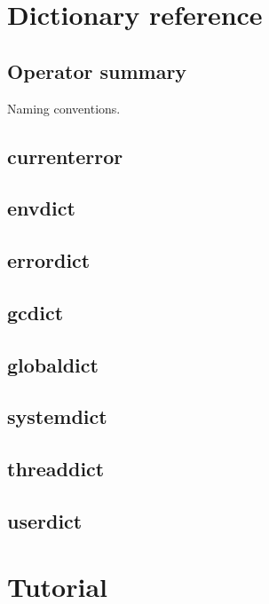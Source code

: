 \section{Dictionary reference}
\subsection{Operator summary}
Naming conventions.
\subsection{currenterror}
\subsection{envdict}
\subsection{errordict}
\subsection{gcdict}
\subsection{globaldict}
\subsection{systemdict}
\subsection{threaddict}
\subsection{userdict}

\section{Tutorial}
